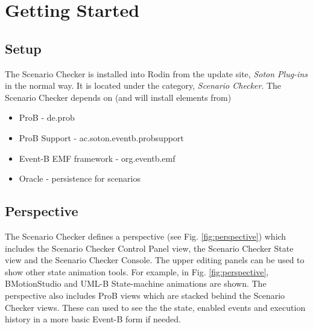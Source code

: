\section{Getting Started}
\label{sec:getting-started}

\subsection{Setup}
\label{sec:setup}

The Scenario Checker is installed into Rodin from the update site, \emph{Soton Plug-ins} in the normal way.
It is located under the category, \emph{Scenario Checker}.
The Scenario Checker depends on (and will install elements from)
\begin{itemize}
\item ProB - de.prob
\item ProB Support - ac.soton.eventb.probsupport
\item Event-B EMF framework - org.eventb.emf
\item Oracle - persistence for scenarios
\end{itemize}

\subsection{Perspective}
\label{sec:perspective}

The Scenario Checker defines a perspective (see Fig. \ref{fig:perspective}) which includes the Scenario Checker Control Panel view, the Scenario Checker State view and the Scenario Checker Console.
The upper editing panels can be used to show other state animation tools.
For example, in Fig. \ref{fig:perspective},  BMotionStudio and UML-B State-machine animations are shown.
The perspective also includes ProB views which are stacked behind the Scenario Checker views.
These can used to see the the state, enabled events and execution history in a more basic Event-B form if needed.

